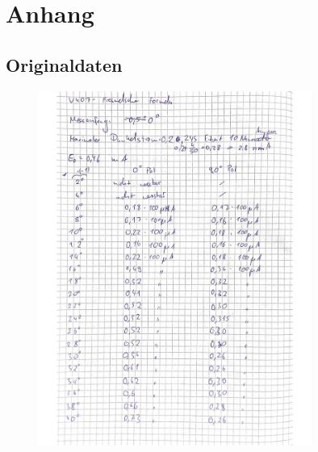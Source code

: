 \section{Anhang}
\label{sec:Anhang}
\subsection{Originaldaten}
%
\begin{figure}[H]
  \centering
  \includegraphics[width=0.8\textwidth]{content/Bilder/1.Blatt.jpeg}
  \label{fig:Messungen_1}
\end{figure}
